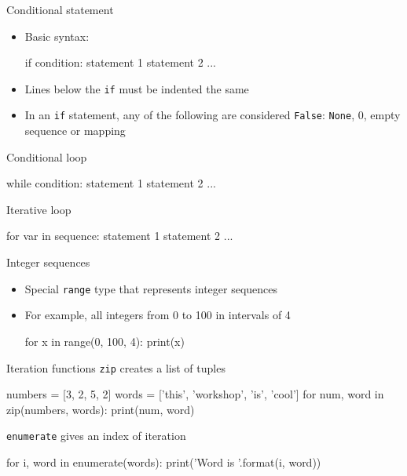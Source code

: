 \documentclass[noamssymb,svgnames]{beamer}
\newcommand{\obj}[1]{\texttt{\color{darkblue}#1}}
\begin{document}
\begin{frame}[fragile]{Conditional statement}
  \begin{itemize}
  \item Basic syntax:
    \begin{python}
        if condition:
            statement 1
            statement 2
            ...
    \end{python}
  \item Lines below the \obj{if} must be indented the same
  \item In an \obj{if} statement, any of the following are considered
    \obj{False}: \obj{None}, 0, empty sequence or mapping
  \end{itemize}
\end{frame}

\begin{frame}[fragile]{Conditional loop}
  \begin{python}
      while condition:
          statement 1
          statement 2
          ...
  \end{python}
\end{frame}

\begin{frame}[fragile]{Iterative loop}
  \begin{python}
      for var in sequence:
          statement 1
          statement 2
          ...
  \end{python}
\end{frame}

\begin{frame}[fragile]{Integer sequences}
  \begin{itemize}
  \item Special \obj{range} type that represents integer sequences
  \item For example, all integers from 0 to 100 in intervals of 4
    \begin{python}
        for x in range(0, 100, 4):
            print(x)
    \end{python}
  \end{itemize}
\end{frame}

\begin{frame}[fragile]{Iteration functions}
  \obj{zip} creates a list of tuples
  \begin{python}
    numbers = [3, 2, 5, 2]
    words = ['this', 'workshop', 'is', 'cool']
    for num, word in zip(numbers, words):
        print(num, word)
  \end{python}
  \vfill
  \obj{enumerate} gives an index of iteration
  \begin{python}
    for i, word in enumerate(words):
        print('Word {} is {}'.format(i, word))
  \end{python}
\end{frame}
\end{document}
